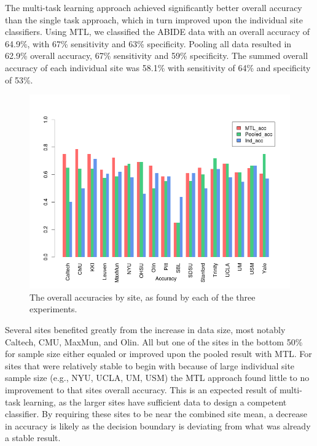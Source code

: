 \documentclass{llncs}
\begin{document}
The multi-task learning approach achieved significantly better overall accuracy than the single task approach, which in turn improved upon the individual site classifiers. Using MTL, we classified the ABIDE data with an  overall accuracy of 64.9\%, with 67\% sensitivity and 63\% specificity.  Pooling all data resulted in 62.9\% overall accuracy, 67\% sensitivity and 59\% specificity. The summed overall accuracy of each individual site was 58.1\% with sensitivity of 64\% and specificity of 53\%. 
\begin{figure}
	\centering
	\includegraphics[scale = .4]{acc_bar.png}
	\caption{The overall accuracies by site, as found by each of the three experiments. }
	\label{fig:acc_bar}
\end{figure}


Several sites benefited greatly from the increase in data size, most notably Caltech, CMU, MaxMun, and Olin.  All but one of the sites in the bottom 50\% for sample size either equaled or improved upon the pooled result with MTL.  For sites that were relatively stable to begin with because of large individual site sample size (e.g., NYU, UCLA, UM, USM) the MTL approach found little to no improvement to that sites overall accuracy. This is an expected result of multi-task learning, as the larger sites have sufficient data to design a competent classifier.  By requiring these sites to be near the combined site mean, a decrease in accuracy is likely as the decision boundary is deviating from what was already a stable result. 
 
\end{document}
